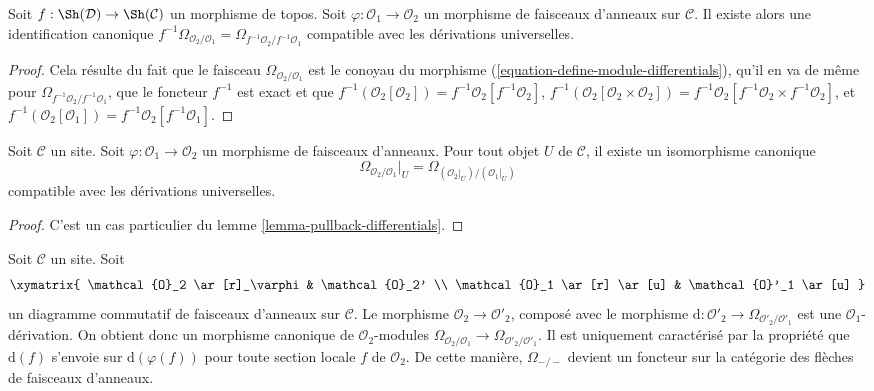 \begin{lemma}

\label{lemma-pullback-differentials}

Soit $f : \Sh(\mathcal{D}) \to \Sh(\mathcal{C})$ un morphisme de topos. Soit
$\varphi : \mathcal{O}_1 \to \mathcal{O}_2$ un morphisme de faisceaux
d'anneaux sur $\mathcal{C}$. Il existe alors une identification canonique
$f^{-1}\Omega_{\mathcal{O}_2/\mathcal{O}_1} =
\Omega_{f^{-1}\mathcal{O}_2/f^{-1}\mathcal{O}_1}$
compatible avec les dérivations universelles.

\end{lemma}

\begin{proof}
Cela résulte du fait que le faisceau
$\Omega_{\mathcal{O}_2/\mathcal{O}_1}$ est le conoyau du morphisme
(\ref{equation-define-module-differentials}), qu'il en va de même pour
$\Omega_{f^{-1}\mathcal{O}_2/f^{-1}\mathcal{O}_1}$, que le foncteur
$f^{-1}$ est exact et que $f^{-1}(\mathcal{O}_2[\mathcal{O}_2]) =
f^{-1}\mathcal{O}_2[f^{-1}\mathcal{O}_2]$, $f^{-1}(\mathcal{O}_2[\mathcal{O}_2 \times \mathcal{O}_2]) =
f^{-1}\mathcal{O}_2[f^{-1}\mathcal{O}_2 \times f^{-1}\mathcal{O}_2]$, et $f^{-1}(\mathcal{O}_2[\mathcal{O}_1]) =
f^{-1}\mathcal{O}_2[f^{-1}\mathcal{O}_1]$.
\end{proof}

\begin{lemma}

\label{lemma-localize-differentials}

Soit $\mathcal{C}$ un site. Soit
$\varphi : \mathcal{O}_1 \to \mathcal{O}_2$ un morphisme de faisceaux
d'anneaux. Pour tout objet $U$ de $\mathcal{C}$, il existe un isomorphisme
canonique
$$
\Omega_{\mathcal{O}_2/\mathcal{O}_1}|_U =
\Omega_{(\mathcal{O}_2|_U)/(\mathcal{O}_1|_U)}
$$
compatible avec les dérivations universelles.

\end{lemma}

\begin{proof}
C'est un cas particulier du lemme \ref{lemma-pullback-differentials}.
\end{proof}

\begin{lemma}

\label{lemma-functoriality-differentials}

Soit $\mathcal{C}$ un site. Soit
$$
\xymatrix{
\mathcal{O}_2 \ar[r]_\varphi & \mathcal{O}_2' \\
\mathcal{O}_1 \ar[r] \ar[u] & \mathcal{O}'_1 \ar[u]
}
$$
un diagramme commutatif de faisceaux d'anneaux sur $\mathcal{C}$. Le morphisme
$\mathcal{O}_2 \to \mathcal{O}'_2$, composé avec le morphisme
$\text{d} : \mathcal{O}'_2 \to \Omega_{\mathcal{O}'_2/\mathcal{O}'_1}$
est une $\mathcal{O}_1$-dérivation. On obtient donc un morphisme canonique de
$\mathcal{O}_2$-modules
$\Omega_{\mathcal{O}_2/\mathcal{O}_1} \to
\Omega_{\mathcal{O}'_2/\mathcal{O}'_1}$. Il est uniquement caractérisé par
la propriété que $\text{d}(f)$ s'envoie sur $\text{d}(\varphi(f))$ pour toute
section locale $f$ de $\mathcal{O}_2$. De cette manière, $\Omega_{-/-}$
devient un foncteur sur la catégorie des flèches de faisceaux d'anneaux.

\end{lemma}

